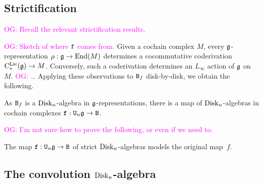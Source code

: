 \documentclass[11pt]{amsart}
\numberwithin{equation}{section}
\def\owen{\textcolor{magenta}{OG: }\textcolor{magenta}}
\begin{document}
\subsection{Strictification}

\owen{Recall the relevant strictification results.}

\owen{Sketch of where ${\tt f}$ comes from.}
Given a cochain complex $M$, every $\mathfrak g$-representation $\rho: \mathfrak g \to {\rm End}(M)$ determines a cocommutative coderivation ${\rm C}^{\rm Lie}_*(\mathfrak g) \to M$.
Conversely, such a coderivation determines an $L_\infty$ action of $\mathfrak g$ on $M$.
\owen{\dots}
Applying these observations to ${\tt B}_f$ disk-by-disk, we obtain the following.

\begin{lmm}
As ${\tt B}_f$ is a ${\rm Disk}_n$-algebra in $\mathfrak g$-representations,
there is a map of ${\rm Disk}_n$-algebras in cochain complexes ${\tt f}:  {\tt U}_n \mathfrak g \to {\tt B}$.
\end{lmm}

\owen{I'm not sure how to prove the following, or even if we need to.}

\begin{prp}
The map ${\tt f}:  {\tt U}_n \mathfrak g \to {\tt B}$ of strict ${\rm Disk}_n$-algebras models the original map~$f$.
\end{prp}

\subsection{The convolution ${\rm Disk}_n$-algebra}
\end{document}
